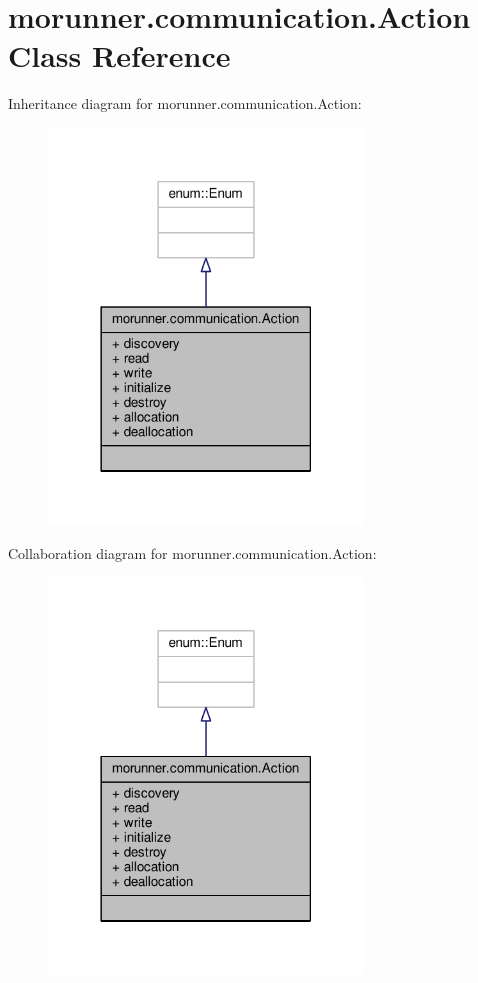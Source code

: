 \hypertarget{classmorunner_1_1communication_1_1Action}{}\section{morunner.\+communication.\+Action Class Reference}
\label{classmorunner_1_1communication_1_1Action}


Inheritance diagram for morunner.\+communication.\+Action\+:
\nopagebreak
\begin{figure}[H]
\begin{center}
\leavevmode
\includegraphics[width=237pt]{classmorunner_1_1communication_1_1Action__inherit__graph}
\end{center}
\end{figure}


Collaboration diagram for morunner.\+communication.\+Action\+:
\nopagebreak
\begin{figure}[H]
\begin{center}
\leavevmode
\includegraphics[width=237pt]{classmorunner_1_1communication_1_1Action__coll__graph}
\end{center}
\end{figure}
